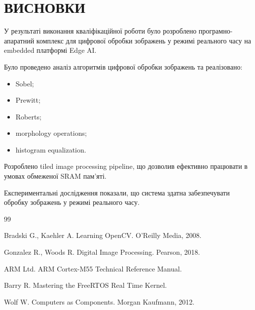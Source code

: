\documentclass[14pt,a4paper]{extreport}
\begin{document}

\chapter*{ВИСНОВКИ}

У результаті виконання кваліфікаційної роботи
було розроблено програмно-апаратний комплекс
для цифрової обробки зображень у режимі реального часу
на embedded платформі Edge AI.

Було проведено аналіз алгоритмів
цифрової обробки зображень та реалізовано:
\begin{itemize}
    \item Sobel;
    \item Prewitt;
    \item Roberts;
    \item morphology operations;
    \item histogram equalization.
\end{itemize}

Розроблено tiled image processing pipeline,
що дозволив ефективно працювати
в умовах обмеженої SRAM пам’яті.

Експериментальні дослідження показали,
що система здатна забезпечувати
обробку зображень у режимі реального часу.


\begin{thebibliography}{99}

Bradski G., Kaehler A.
Learning OpenCV.
O'Reilly Media, 2008.

Gonzalez R., Woods R.
Digital Image Processing.
Pearson, 2018.

ARM Ltd.
ARM Cortex-M55 Technical Reference Manual.

Barry R.
Mastering the FreeRTOS Real Time Kernel.

Wolf W.
Computers as Components.
Morgan Kaufmann, 2012.

\end{thebibliography}
\end{document}

